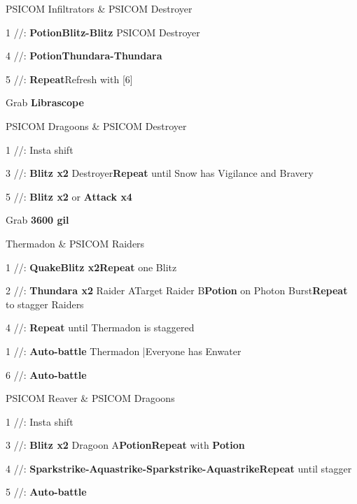 \begin{fight}{PSICOM Infiltrators \& PSICOM Destroyer}
	\item [1] \com/\syn/\com: \textbf{Potion}\to \textbf{Blitz-Blitz} PSICOM Destroyer
	\item [4] \rav/\rav/\rav: \textbf{Potion}\to \textbf{Thundara-Thundara}
	\item [5] \com/\com/\com: \textbf{Repeat}\to Refresh with [6]
\end{fight}
\begin{mainlist}
	\item Grab \textbf{Librascope}
\end{mainlist}
\begin{fight}{PSICOM Dragoons \& PSICOM Destroyer}
	\item [1] \com/\syn/\com: Insta shift
	\item [3] \com/\syn/\sen: \textbf{Blitz x2} Destroyer\to \textbf{Repeat} until Snow has Vigilance and Bravery
	\item [5] \com/\com/\com: \textbf{Blitz x2} or \textbf{Attack x4}
\end{fight}
\begin{mainlist}
	\item Grab \textbf{3600 gil}
\end{mainlist}
\begin{fight}{Thermadon \& PSICOM Raiders}
	\item [1] \com/\syn/\com: \textbf{Quake}\to \textbf{Blitz x2}\to \textbf{Repeat} one Blitz
	\item [2] \rav/\rav/\rav: \textbf{Thundara x2} Raider A\to Target Raider B\to \textbf{Potion} on Photon Burst\to \textbf{Repeat} to stagger Raiders
	\item [4] \rav/\rav/\rav: \textbf{Repeat} until Thermadon is staggered
	\item [1] \com/\syn/\com: \textbf{Auto-battle} Thermadon |Everyone has Enwater
	\item [6] \com/\com/\com: \textbf{Auto-battle}
\end{fight}
\begin{fight}{PSICOM Reaver \& PSICOM Dragoons}
	\item [1] \com/\syn/\com: Insta shift
	\item [3] \com/\syn/\sen: \textbf{Blitz x2} Dragoon A\to \textbf{Potion}\to \textbf{Repeat} with \textbf{Potion}
	\item [4] \rav/\rav/\rav: \textbf{Sparkstrike-Aquastrike-Sparkstrike-Aquastrike}\to \textbf{Repeat} until stagger
	\item [5] \com/\com/\com: \textbf{Auto-battle}
\end{fight}
